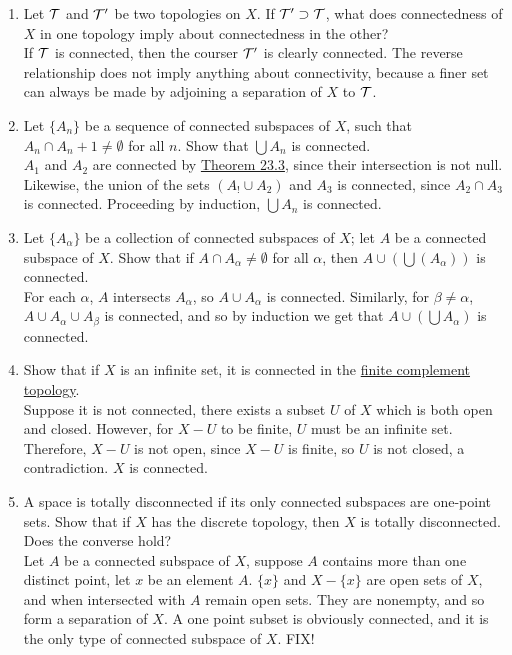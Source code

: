 \documentclass[12pt,letterpaper]{article}
\begin{document}
\RaggedRight
\begin{enumerate}
  \item Let $\mathcal{T}$ and $\mathcal{T}'$ be two topologies on $X$. If $\mathcal{T}'\supset\mathcal{T}$, what does connectedness of $X$ in one topology imply about connectedness in the other?\\
  If $\mathcal{T}$ is connected, then the courser $\mathcal{T}'$ is clearly connected. The reverse relationship does not imply anything about connectivity, because a finer set can always be made by adjoining a separation of $X$ to $\mathcal{T}$.
  \item Let $\{A_n\}$ be a sequence of connected subspaces of $X$, such that $A_n\cap A_n+1 \neq \emptyset$ for all $n$. Show that $\bigcup A_n$ is connected. \\
  $A_1$ and $A_2$ are connected by \hyperref[thm:unionConnected]{Theorem 23.3}, since their intersection is not null. Likewise, the union of the sets $(A_!\cup A_2)$ and $A_3$ is connected, since $A_2\cap A_3$ is connected. Proceeding by induction, $\bigcup A_n$ is connected.
  \item Let $\{A_\alpha\}$ be a collection of connected subspaces of $X$; let $A$ be a connected subspace of $X$. Show that if $A\cap A_\alpha\neq\emptyset$ for all $\alpha$, then $A\cup(\bigcup(A_\alpha))$ is connected.\\
  For each $\alpha$, $A$ intersects $A_\alpha$, so $A\cup A_\alpha$ is connected. Similarly, for $\beta\neq\alpha$, $A\cup A_\alpha \cup A_\beta$ is connected, and so by induction we get that $A\cup(\bigcup A_\alpha)$ is connected.
  \item Show that if $X$ is an infinite set, it is connected in the \hyperref[dfn:finiteComplementTopology]{finite complement topology}. \\
  Suppose it is not connected, there exists a subset $U$ of $X$ which is both open and closed. However, for $X-U$ to be finite, $U$ must be an infinite set. Therefore, $X-U$ is not open, since $X-U$ is finite, so $U$ is not closed, a contradiction. $X$ is connected.
  \item A space is totally disconnected if its only connected subspaces are one-point sets. Show that if $X$ has the discrete topology, then $X$ is totally disconnected. Does the converse hold? \\
  Let $A$ be a connected subspace of $X$, suppose $A$ contains more than one distinct point, let $x$ be an element $A$. $\{x\}$ and $X-\{x\}$ are open sets of $X$, and when intersected with $A$ remain open sets. They are nonempty, and so form a separation of $X$. A one point subset is obviously connected, and it is the only type of connected subspace of $X$. FIX!%

\end{enumerate}
\end{document}

